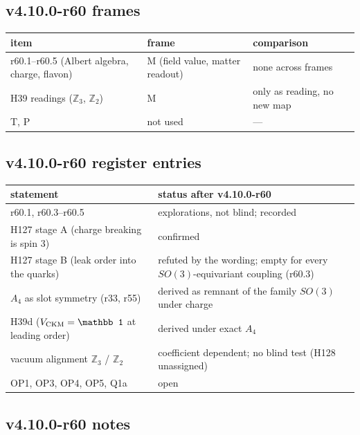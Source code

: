 \subsection*{v4.10.0-r60 frames}
\label{subsec:v4100-r60-frames}

\begin{center}
\small
\begin{tabular}{@{}lll@{}}
\toprule
item & frame & comparison\\
\midrule
r60.1--r60.5 (Albert algebra, charge, flavon) & M (field value, matter readout) & none across frames\\
H39 readings (\(\mathbb Z_3\), \(\mathbb Z_2\)) & M & only as reading, no new map\\
T, P & not used & ---\\
\bottomrule
\end{tabular}
\end{center}

\subsection*{v4.10.0-r60 register entries}
\label{subsec:v4100-r60-register}

\begin{center}
\small
\begin{tabular}{@{}>{\raggedright\arraybackslash}p{}>{\raggedright\arraybackslash}p{}@{}}
\toprule
statement & status after v4.10.0-r60\\
\midrule
r60.1, r60.3--r60.5 & explorations, not blind; recorded\\
H127 stage A (charge breaking is spin 3) & confirmed\\
H127 stage B (leak order into the quarks) & refuted by the wording; empty for every \(SO(3)\)-equivariant coupling (r60.3)\\
\(A_4\) as slot symmetry (r33, r55) & derived as remnant of the family \(SO(3)\) under charge\\
H39d (\(V_{\rm CKM}=\mathbb 1\) at leading order) & derived under exact \(A_4\)\\
vacuum alignment \(\mathbb Z_3\) / \(\mathbb Z_2\) & coefficient dependent; no blind test (H128 unassigned)\\
OP1, OP3, OP4, OP5, Q1a & open\\
\bottomrule
\end{tabular}
\end{center}

\subsection*{v4.10.0-r60 notes}
\label{subsec:v4100-r60-notes}

